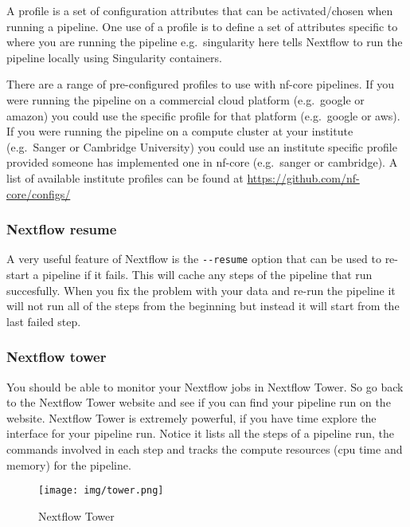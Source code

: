 \documentclass[11pt]{article}
\begin{document}
A profile is a set of configuration attributes that can be
activated/chosen when running a pipeline. One use of a profile is to
define a set of attributes specific to where you are running the
pipeline e.g.~singularity here tells Nextflow to run the pipeline
locally using Singularity containers.

There are a range of pre-configured profiles to use with nf-core
pipelines. If you were running the pipeline on a commercial cloud
platform (e.g.~google or amazon) you could use the specific profile for
that platform (e.g.~google or aws). If you were running the pipeline on
a compute cluster at your institute (e.g.~Sanger or Cambridge
University) you could use an institute specific profile provided someone
has implemented one in nf-core (e.g.~sanger or cambridge). A list of
available institute profiles can be found at
\url{https://github.com/nf-core/configs/}

    \hypertarget{nextflow-resume}{%
\subsubsection{Nextflow resume}\label{nextflow-resume}}

A very useful feature of Nextflow is the \texttt{-\/-resume} option that
can be used to re-start a pipeline if it fails. This will cache any
steps of the pipeline that run succesfully. When you fix the problem
with your data and re-run the pipeline it will not run all of the steps
from the beginning but instead it will start from the last failed step.

    \hypertarget{nextflow-tower}{%
\subsubsection{Nextflow tower}\label{nextflow-tower}}

You should be able to monitor your Nextflow jobs in Nextflow Tower. So
go back to the Nextflow Tower website and see if you can find your
pipeline run on the website. Nextflow Tower is extremely powerful, if
you have time explore the interface for your pipeline run. Notice it
lists all the steps of a pipeline run, the commands involved in each
step and tracks the compute resources (cpu time and memory) for the
pipeline.

    \begin{figure}
\centering
\texttt{[image: img/tower.png]}
\caption{Nextflow Tower}
\end{figure}
\end{document}
